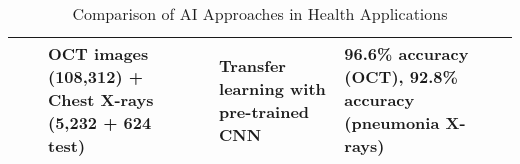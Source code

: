 \begin{table}[htbp]
\begin{adjustwidth}{-2cm}{-2cm}
\begin{tabular}{|p{1.5cm}|p{2.5cm}|p{3cm}|p{3.5cm}|p{2.5cm}|p{2.5cm}|}
\hline
\cite{article_21} &  & OCT images (108,312) + Chest X-rays (5,232 + 624 test) &  & Transfer learning with pre-trained CNN  & 96.6\% accuracy (OCT), 92.8\% accuracy (pneumonia X-rays) \\
\hline
\end{tabular}
\caption{Comparison of AI Approaches in Health Applications}
\label{tab:ai_health_comparison}
\end{adjustwidth}
\end{table}






